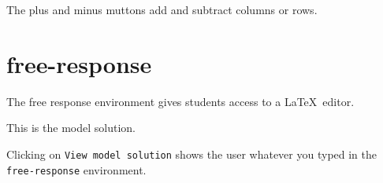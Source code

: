 \documentclass{ximera}
\begin{document}
\begin{remark}
The plus and minus muttons add and subtract columns or rows.  
\end{remark}

\section{free-response}

The free response environment gives students access to a \LaTeX\ editor. 

\begin{free-response}
	This is the model solution.
\end{free-response}

\begin{remark}
Clicking on \verb!View model solution! shows the user
whatever you typed in the  \verb!free-response! environment.
\end{remark}
	
\end{document}
